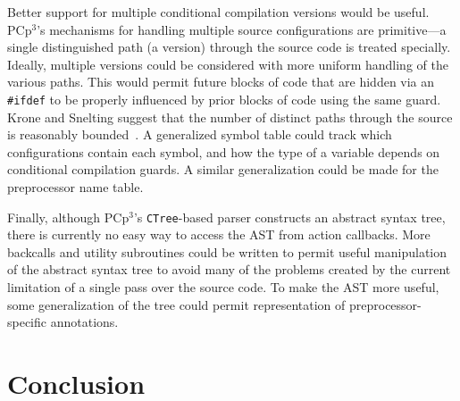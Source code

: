 \documentclass{article}
\newcommand{\pcp}{\mbox{\textsf{PCp}$^3$}}
\newcommand{\Perl}{\mbox{Perl}}
\newcommand{\C}{\mbox{C}}
\newcommand{\ppd}[1]{\texttt{\##1}}
\begin{document}
Better support for multiple conditional compilation versions would be
useful. \pcp{}'s mechanisms for
handling multiple source configurations are primitive---a single
distinguished path (a version) through the source code is treated
specially.  Ideally, multiple versions could be considered with more
uniform handling of the various paths.  This would permit future blocks
of code that are hidden via an \ppd{ifdef} to be properly influenced by prior
blocks of code using the same guard.  Krone and Snelting suggest
that the number of distinct paths through the source is reasonably
bounded~\cite{Krone94}.  A generalized symbol table could track which
configurations contain each symbol, and how the type of a variable
depends on conditional compilation guards.  A similar generalization
could be made for the preprocessor name table.


Finally, although \pcp{}'s \texttt{CTree}-based parser constructs an abstract syntax
tree, there is currently no easy way to access the AST from action
callbacks.  More backcalls and utility subroutines could be
written to permit useful manipulation of the abstract syntax tree to
avoid many of the problems created by the current limitation of a single
pass over the source code.  To make the AST more useful, some
generalization of the tree could permit representation of
preprocessor-specific annotations.



\section{Conclusion}
\label{sec:conclusion}
\end{document}
